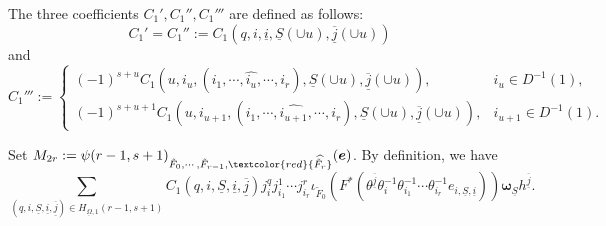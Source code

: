 \documentclass[12pt, a4paper]{article}
\begin{document}
 The three coefficients $C_1',C_1'',C_1'''$ are defined as follows:
 $$
 C_1'=C_1'':=C_1(q,i,\underline i,\underline S(\cup u),\overline{\underline j}(\cup u))
 $$
and
$$
C_1''':=\left\{
\begin{matrix}
(-1)^{s+u}C_1(u,i_u,(i_1,\cdots,\widehat{i_u},\cdots,i_r),\underline S(\cup u),\overline{\underline j}(\cup u)),&i_u\in D^{-1}(1),\\
(-1)^{s+u+1}C_1(u,i_{u+1},(i_1,\cdots,\widehat{i_{u+1}},\cdots,i_r),\underline S(\cup u),\overline{\underline j}(\cup u)),&i_{u+1}\in D^{-1}(1).
\end{matrix}
\right.
$$

Set $M_{2r}:=\psi(r-1,s+1)_{\tilde F_0,\cdots,\tilde F_{r-1},\textcolor{red}{\widehat{\tilde F_r}}}(\boldsymbol{e})$. By definition, we have
$$
\sum_{(q,i,\underline S,\underline i,\underline{\overline j})\in H_{\underline\Omega,1}(r-1,s+1)} C_1(q,i,\underline S,\underline i,\underline{\overline j})j^q_ij^1_{i_1}\cdots j^r_{i_r}\iota_{\tilde F_0}(F^*(\theta^{\underline{\overline j}}\theta_i^{-1}\theta_{i_1}^{-1}\cdots\theta_{i_r}^{-1}e_{i,\underline S,\underline i}))\boldsymbol{\omega}_{\underline S}h^{\underline{\overline j}}.
$$
\end{document}
